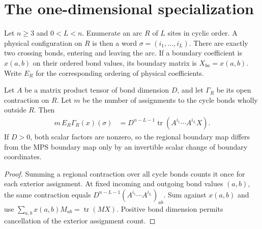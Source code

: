 \section{The one-dimensional specialization}%
\label{sec:peps_cycle_ground_space}

\begin{definition}%
    \label{def:peps_cycle_arc_coordinates}
    \leanok
    Let $n\geq3$ and $0<L<n$. Enumerate an arc $R$ of $L$ sites in
    cyclic order. A physical configuration on $R$ is then a word
    $\sigma=(i_1,\ldots,i_L)$. There are exactly two crossing bonds,
    entering and leaving the arc. If a boundary coefficient is
    $x(a,b)$ on their ordered bond values, its boundary matrix is
    $X_{ba}=x(a,b)$. Write $E_R$ for the corresponding ordering of
    physical coefficients.
\end{definition}

\begin{lemma}%
    \label{lem:peps_cycle_arc_boundary_matrix}
    \leanok
    Let $A$ be a matrix product tensor of bond dimension $D$, and
    let $\Gamma_R$ be its open contraction on $R$. Let $m$ be the
    number of assignments to the cycle bonds wholly outside $R$.
    Then
    \begin{align}
        m\,E_R\Gamma_R(x)(\sigma)
         & =D^{n-L-1}\operatorname{tr}
        (A^{i_1}\cdots A^{i_L}X).
        \label{eq:peps_cycle_arc_boundary_matrix}
    \end{align}
    If $D>0$, both scalar factors are nonzero, so the regional
    boundary map differs from the MPS boundary map only by an
    invertible scalar change of boundary coordinates.
\end{lemma}

\begin{proof}\leanok
    Summing a regional contraction over all cycle bonds counts it
    once for each exterior assignment. At fixed incoming and
    outgoing bond values $(a,b)$, the same contraction equals
    $D^{n-L-1}(A^{i_1}\cdots A^{i_L})_{ab}$.
    Sum against $x(a,b)$ and use
    $\sum_{a,b}x(a,b)M_{ab}=\operatorname{tr}(MX)$.
    Positive bond dimension permits cancellation of the exterior
    assignment count.
\end{proof}

